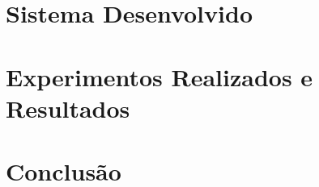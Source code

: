 \documentclass[rascunho]{fei}
\begin{document}
\chapter{Sistema Desenvolvido}
\label{chap:software}



\chapter{Experimentos Realizados e Resultados}
\label{chap:experiments}





\chapter{Conclusão}






%

\anexos


\end{document}
